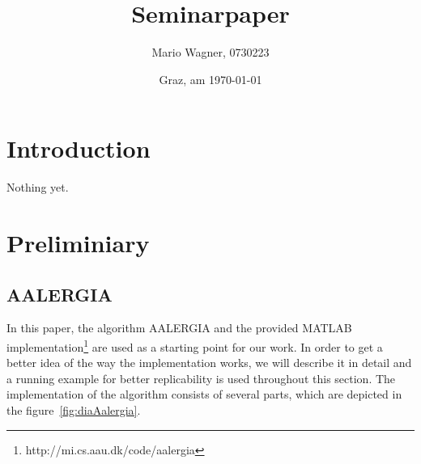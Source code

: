 \documentclass[
a4paper,     %
12pt         %
]{scrartcl}  %
\title{Seminarpaper}
\author{Mario Wagner, 0730223}
\date{Graz, am \today{}}
\begin{document}

 \maketitle

 \tableofcontents

\listoffigures

 \listoftables

\newpage


\section{Introduction}
Nothing yet.

\newpage
\section{Preliminiary}

\subsection{AALERGIA}

In this paper, the algorithm AALERGIA\cite{Mao.} and the provided MATLAB implementation\footnote{http://mi.cs.aau.dk/code/aalergia} are used as a starting point for our work. In order to get a better idea of the way the implementation works, we will describe it in detail and a running example for better replicability is used throughout this section. The implementation of the algorithm consists of several parts, which are depicted in the figure~\ref{fig:diaAalergia}.
\end{document}
